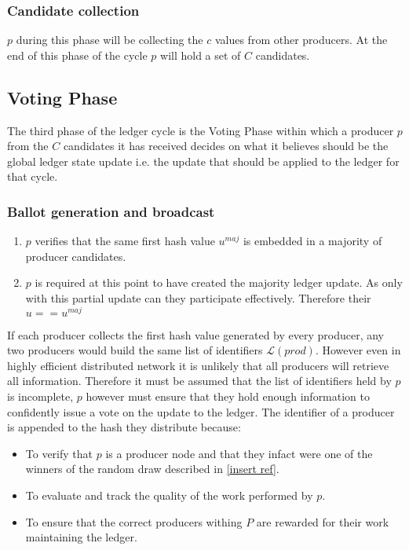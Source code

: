 \documentclass{article}
\begin{document}
\subsubsection{Candidate collection}

$p$ during this phase will be collecting the $c$ values from other producers. At the end of this phase of the cycle $p$ will hold a set of $C$ candidates.



\subsection{Voting Phase}

The third phase of the ledger cycle is the Voting Phase within which a producer $p$ from the $C$ candidates it has received decides on what it believes should be the global ledger state update i.e. the update that should be applied to the ledger for that cycle. 


\subsubsection{Ballot generation and broadcast}

\begin{enumerate}
\item $p$ verifies that the same first hash value $u^{maj}$ is embedded in a majority of producer candidates. 
\item $p$ is required at this point to have created the majority ledger update. As only with this partial update can they participate effectively. Therefore their $u == u^{maj}$

\end{enumerate}
 
If each producer collects the first hash value generated by every producer, any two producers would build the same list of identifiers $\mathcal{L}(prod)$. However even in highly efficient distributed network it is unlikely that all producers will retrieve all information. Therefore it must be assumed that the list of identifiers held by $p$ is incomplete, $p$ however must ensure that they hold enough information to confidently issue a vote on the update to the ledger. The identifier of a producer is appended to the hash they distribute because: 

\begin{itemize}
\item To verify that $p$ is a producer node and that they infact were one of the winners of the random draw described in \ref{insert ref}. 
\item To evaluate and track the quality of the work performed by $p$.
\item To ensure that the correct producers withing $P$ are rewarded for their work maintaining the ledger. \\

\end{itemize} 
\end{document}

